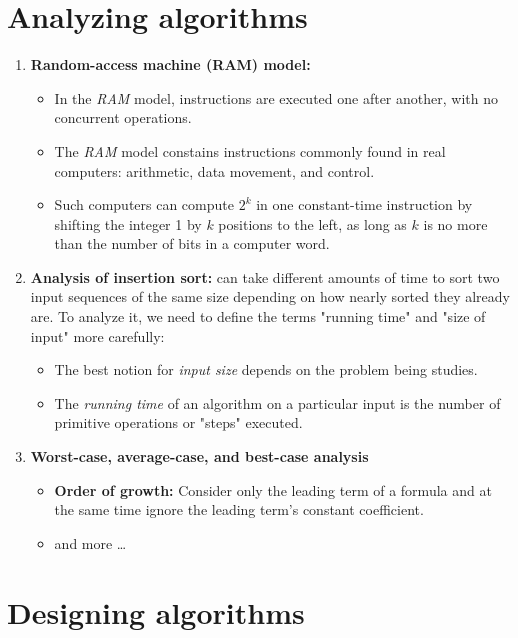 \documentclass{report}
\begin{document}
\section{Analyzing algorithms}
\begin{enumerate}[leftmargin=*]
    \item \textbf{Random-access machine (RAM) model:} 
    \begin{itemize}
        \item In the \emph{RAM} model, instructions are executed one after another, with no concurrent operations.
        \item The \emph{RAM} model constains instructions commonly found in real computers: arithmetic, data movement, and control.
        \item Such computers can compute $2^k$ in one constant-time instruction by shifting the integer 1 by $k$ positions to the left, as long as $k$ is no more than the number of bits in a computer word.
    \end{itemize}
    \item \textbf{Analysis of insertion sort:}  can take different amounts of time to sort two input sequences of the same size depending on how nearly sorted they already are. To analyze it, we need to define the terms "running time" and "size of input" more carefully:
    \begin{itemize}
        \item The best notion for \emph{input size} depends on the problem being studies. 
        \item The \emph{running time} of an algorithm on a particular input is the number of primitive operations or "steps" executed.
    \end{itemize}
    \item \textbf{Worst-case, average-case, and best-case analysis}
    \begin{itemize}
        \item \textbf{Order of growth:} Consider only the leading term of a formula and at the same time ignore the leading term's constant coefficient.
        \item and more \dots
    \end{itemize}
\end{enumerate}

\section{Designing algorithms}
\end{document}
